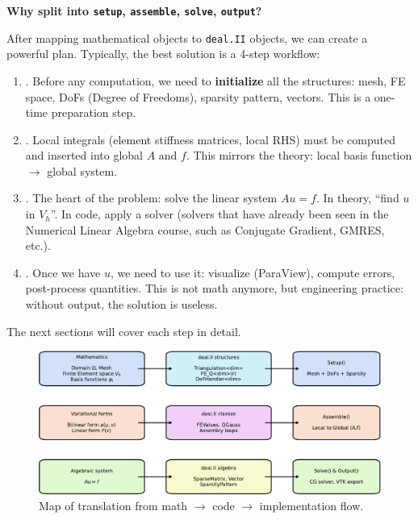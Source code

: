 \highspace
\begin{flushleft}
    \textcolor{Green3}{ \textbf{Why split into \texttt{setup}, \texttt{assemble}, \texttt{solve}, \texttt{output}?}}
\end{flushleft}
After mapping mathematical objects to \texttt{deal.II} objects, we can create a powerful plan. Typically, the best solution is a 4-step workflow:
\begin{enumerate}
    \item {}. Before any computation, we need to \textbf{initialize} all the structures: mesh, FE space, DoFs (Degree of Freedoms), sparsity pattern, vectors. This is a one-time preparation step.
    \item {}. Local integrals (element stiffness matrices, local RHS) must be computed and inserted into global $A$ and $f$. This mirrors the theory: local basis function $\rightarrow$ global system.
    \item {}. The heart of the problem: solve the linear system $Au = f$. In theory, ``find $u$ in $V_h$''. In code, apply a solver (solvers that have already been seen in the Numerical Linear Algebra course, such as Conjugate Gradient, GMRES, etc.).
    \item {}. Once we have $u$, we need to use it: visualize (ParaView), compute errors, post-process quantities. This is not math anymore, but engineering practice: without output, the solution is useless.
\end{enumerate}
The next sections will cover each step in detail.

\newpage

\begin{landscape}
    \begin{figure}[!htp]
        \centering
        \includegraphics[width=1.6\textwidth]{img/poisson-1d/pde-workflow.pdf}
        \caption{Map of translation from math $\rightarrow$ code $\rightarrow$ implementation flow.}
    \end{figure}
\end{landscape}

